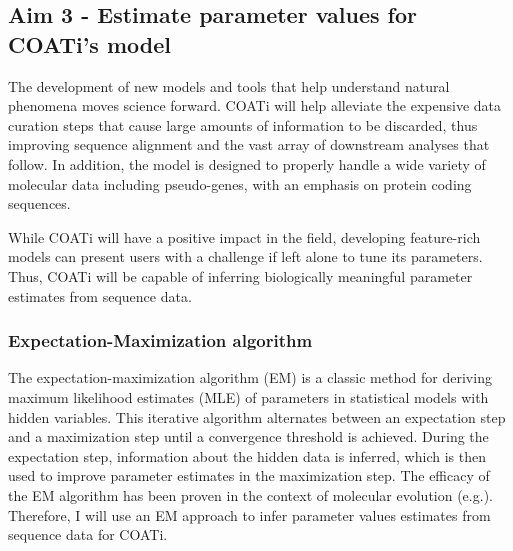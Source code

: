 \subsection{Aim 3 - Estimate parameter values for COATi's model}



The development of new models and tools that help understand natural phenomena
moves science forward.
COATi will help alleviate the expensive data curation steps that cause large
amounts of information to be discarded, thus improving sequence alignment and
the vast array of downstream analyses that follow.
In addition, the model is designed to properly handle a wide variety of
molecular data including pseudo-genes, with an emphasis on protein coding
sequences.

While COATi will have a positive impact in the field, developing feature-rich
models can present users with a challenge if left alone to tune its parameters.
Thus, COATi will be capable of inferring biologically meaningful parameter
estimates from sequence data.

\subsubsection{Expectation-Maximization algorithm}
The expectation-maximization algorithm (EM)
\parencite{dempster_laird_rubin_EM_1977} is a classic method for deriving
maximum likelihood estimates (MLE) of parameters in statistical models with
hidden variables.
This iterative algorithm alternates between an expectation step and a
maximization step until a convergence threshold is achieved.
During the expectation step, information about the hidden data is inferred,
which is then used to improve parameter estimates in the maximization step.
The efficacy of the EM algorithm has been proven in the context of molecular
evolution (e.g.\cite{holmes2002expectation,holmes_em_2005}).
Therefore, I will use an EM approach to infer parameter values estimates from
sequence data for COATi.

